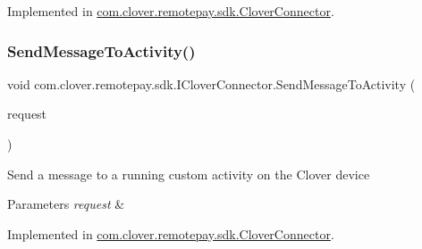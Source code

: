 Implemented in \hyperlink{classcom_1_1clover_1_1remotepay_1_1sdk_1_1_clover_connector_a1adbcc8a0d4aaa82157a102af4f16b91}{com.\+clover.\+remotepay.\+sdk.\+Clover\+Connector}.

\mbox{\label{interfacecom_1_1clover_1_1remotepay_1_1sdk_1_1_i_clover_connector_ad6e241f6dac22bafa5edcc89457c99a7}} 
\subsubsection{\texorpdfstring{Send\+Message\+To\+Activity()}{SendMessageToActivity()}}
{\footnotesize\ttfamily void com.\+clover.\+remotepay.\+sdk.\+I\+Clover\+Connector.\+Send\+Message\+To\+Activity (\begin{DoxyParamCaption}\item[{\hyperlink{classcom_1_1clover_1_1remotepay_1_1sdk_1_1_message_to_activity}{Message\+To\+Activity}}]{request }\end{DoxyParamCaption})}



Send a message to a running custom activity on the Clover device 


\begin{DoxyParams}{Parameters}
{\em request} & \\
\hline
\end{DoxyParams}


Implemented in \hyperlink{classcom_1_1clover_1_1remotepay_1_1sdk_1_1_clover_connector_a328a0dd8b4ed02567f7e8d3184f35038}{com.\+clover.\+remotepay.\+sdk.\+Clover\+Connector}.

\mbox{\label{interfacecom_1_1clover_1_1remotepay_1_1sdk_1_1_i_clover_connector_a50be4c513f6f67971b51f6f76f30ac06}} 
